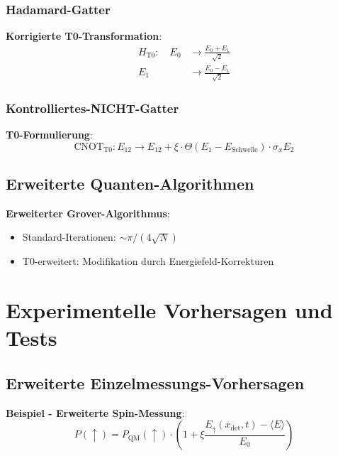 \documentclass[12pt,a4paper]{article}
\newcommand{\xipar}{\xi}
\begin{document}
	\subsubsection{Hadamard-Gatter}
	
	\textbf{Korrigierte T0-Transformation}:
	\begin{align}
		H_{\mathrm{T0}}: \quad E_0 &\rightarrow \frac{E_0 + E_1}{\sqrt{2}} \\
		E_1 &\rightarrow \frac{E_0 - E_1}{\sqrt{2}}
	\end{align}
	
	\subsubsection{Kontrolliertes-NICHT-Gatter}
	
	\textbf{T0-Formulierung}:
	\begin{equation}
		\text{CNOT}_{\mathrm{T0}}: E_{12} \rightarrow E_{12} + \xipar \cdot \Theta(E_1 - E_{\mathrm{Schwelle}}) \cdot \sigma_x E_2
	\end{equation}
	
	\subsection{Erweiterte Quanten-Algorithmen}
	
	\textbf{Erweiterter Grover-Algorithmus}:
	\begin{itemize}
		\item Standard-Iterationen: $\sim \pi/(4\sqrt{N})$
		\item T0-erweitert: Modifikation durch Energiefeld-Korrekturen
	\end{itemize}
	
	\section{Experimentelle Vorhersagen und Tests}
	
	\subsection{Erweiterte Einzelmessungs-Vorhersagen}
	
	\textbf{Beispiel - Erweiterte Spin-Messung}:
	\begin{equation}
		\boxed{P(\uparrow) = P_{\mathrm{QM}}(\uparrow) \cdot \left(1 + \xipar \frac{E_{\uparrow}(x_{\mathrm{det}}, t) - \langle E \rangle}{E_0}\right)}
		\label{eq:erweiterte_messung}
	\end{equation}
	
\end{document}
